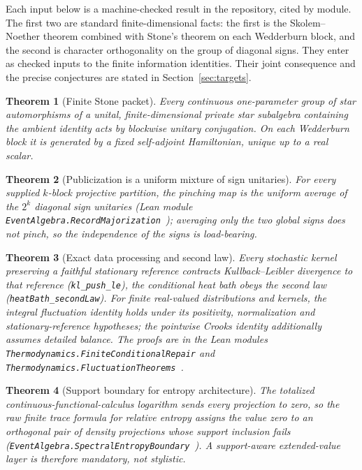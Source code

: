 \documentclass[11pt]{article}
\newtheorem{theorem}{Theorem}[section]
\theoremstyle{remark}
\begin{document}
Each input below is a machine-checked result in the repository, cited by
module. The first two are standard finite-dimensional facts: the first is
the Skolem--Noether theorem combined with Stone's theorem on each Wedderburn
block, and the second is character orthogonality on the group of diagonal
signs. They enter as checked inputs to the finite information identities. Their joint consequence and the precise conjectures are stated in
Section~\ref{sec:targets}.

\begin{theorem}[Finite Stone packet]
Every continuous one-parameter group of star automorphisms of a unital,
finite-dimensional private star subalgebra containing the ambient identity
acts by blockwise unitary conjugation. On each Wedderburn block it is generated
by a fixed self-adjoint Hamiltonian, unique up to a real scalar.
\end{theorem}

\begin{theorem}[Publicization is a uniform mixture of sign unitaries]
For every supplied $k$-block projective partition, the pinching map is
the uniform average of the $2^{k}$ diagonal sign unitaries
(Lean module \texttt{EventAlgebra.RecordMajorization}~\cite{ophlean});
averaging only the two
global signs does not pinch, so the independence of the signs is
load-bearing.
\end{theorem}

\begin{theorem}[Exact data processing and second law]
Every stochastic kernel preserving a faithful stationary reference
contracts Kullback--Leibler divergence to that reference
(\texttt{kl\_push\_le}), the conditional heat bath obeys the second law
(\texttt{heatBath\_secondLaw}). For finite real-valued distributions and
kernels, the integral fluctuation identity holds under its positivity,
normalization and stationary-reference hypotheses; the pointwise Crooks
identity additionally assumes detailed balance.
The proofs are in the Lean modules
\texttt{Thermodynamics.FiniteConditionalRepair} and
\texttt{Thermodynamics.FluctuationTheorems}~\cite{ophlean}.
\end{theorem}

\begin{theorem}[Support boundary for entropy architecture]
The totalized continuous-functional-calculus logarithm sends every
projection to zero, so the raw finite trace formula for relative entropy
assigns the value zero to an orthogonal pair of density projections whose
support inclusion fails
(\texttt{EventAlgebra.SpectralEntropyBoundary}~\cite{ophlean}). A support-aware
extended-value layer is therefore mandatory, not stylistic.
\end{theorem}
\end{document}
